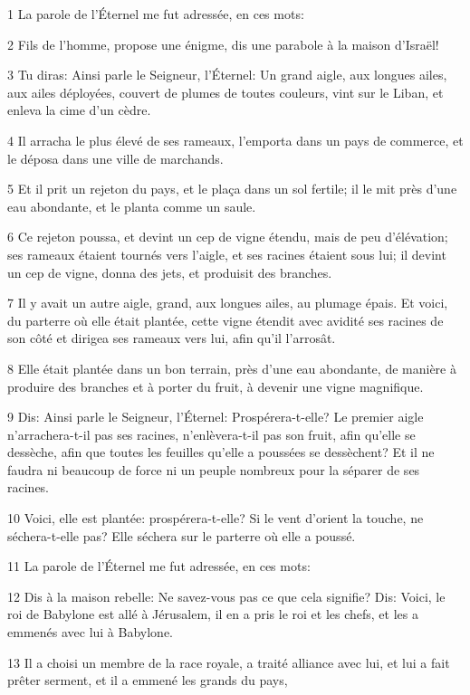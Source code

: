 \par 1 La parole de l'Éternel me fut adressée, en ces mots:
\par 2 Fils de l'homme, propose une énigme, dis une parabole à la maison d'Israël!
\par 3 Tu diras: Ainsi parle le Seigneur, l'Éternel: Un grand aigle, aux longues ailes, aux ailes déployées, couvert de plumes de toutes couleurs, vint sur le Liban, et enleva la cime d'un cèdre.
\par 4 Il arracha le plus élevé de ses rameaux, l'emporta dans un pays de commerce, et le déposa dans une ville de marchands.
\par 5 Et il prit un rejeton du pays, et le plaça dans un sol fertile; il le mit près d'une eau abondante, et le planta comme un saule.
\par 6 Ce rejeton poussa, et devint un cep de vigne étendu, mais de peu d'élévation; ses rameaux étaient tournés vers l'aigle, et ses racines étaient sous lui; il devint un cep de vigne, donna des jets, et produisit des branches.
\par 7 Il y avait un autre aigle, grand, aux longues ailes, au plumage épais. Et voici, du parterre où elle était plantée, cette vigne étendit avec avidité ses racines de son côté et dirigea ses rameaux vers lui, afin qu'il l'arrosât.
\par 8 Elle était plantée dans un bon terrain, près d'une eau abondante, de manière à produire des branches et à porter du fruit, à devenir une vigne magnifique.
\par 9 Dis: Ainsi parle le Seigneur, l'Éternel: Prospérera-t-elle? Le premier aigle n'arrachera-t-il pas ses racines, n'enlèvera-t-il pas son fruit, afin qu'elle se dessèche, afin que toutes les feuilles qu'elle a poussées se dessèchent? Et il ne faudra ni beaucoup de force ni un peuple nombreux pour la séparer de ses racines.
\par 10 Voici, elle est plantée: prospérera-t-elle? Si le vent d'orient la touche, ne séchera-t-elle pas? Elle séchera sur le parterre où elle a poussé.
\par 11 La parole de l'Éternel me fut adressée, en ces mots:
\par 12 Dis à la maison rebelle: Ne savez-vous pas ce que cela signifie? Dis: Voici, le roi de Babylone est allé à Jérusalem, il en a pris le roi et les chefs, et les a emmenés avec lui à Babylone.
\par 13 Il a choisi un membre de la race royale, a traité alliance avec lui, et lui a fait prêter serment, et il a emmené les grands du pays,
